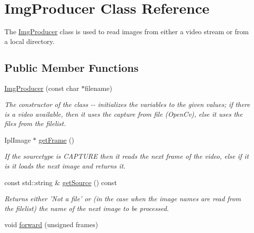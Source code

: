 \hypertarget{classImgProducer}{
\section{ImgProducer Class Reference}
\label{classImgProducer}
}


The {\ttfamily \hyperlink{classImgProducer}{ImgProducer}} class is used to read images from either a video stream or from a local directory.  


\subsection*{Public Member Functions}
\begin{DoxyCompactItemize}
\item 
\hypertarget{classImgProducer_adea70514206a6a2f7c35b9cb48663c5f}{
\hyperlink{classImgProducer_adea70514206a6a2f7c35b9cb48663c5f}{ImgProducer} (const char $\ast$filename)}
\label{classImgProducer_adea70514206a6a2f7c35b9cb48663c5f}

\begin{DoxyCompactList}\small\item\em The constructor of the class -\/-\/ initializes the variables to the given values; if there is a video available, then it uses the capture from file (OpenCv), else it uses the files from the {\ttfamily filelist}. \item\end{DoxyCompactList}\item 
\hypertarget{classImgProducer_a3874d48fa5613c7ed22ab89132b3a5c6}{
IplImage $\ast$ \hyperlink{classImgProducer_a3874d48fa5613c7ed22ab89132b3a5c6}{getFrame} ()}
\label{classImgProducer_a3874d48fa5613c7ed22ab89132b3a5c6}

\begin{DoxyCompactList}\small\item\em If the {\ttfamily sourcetype} is {\ttfamily CAPTURE} then it reads the next frame of the video, else if it is  it loads the next image and returns it. \item\end{DoxyCompactList}\item 
\hypertarget{classImgProducer_a9e0315d8ff2f35e0a752c01ab57166fa}{
const std::string \& \hyperlink{classImgProducer_a9e0315d8ff2f35e0a752c01ab57166fa}{getSource} () const }
\label{classImgProducer_a9e0315d8ff2f35e0a752c01ab57166fa}

\begin{DoxyCompactList}\small\item\em Returns either 'Not a file' or (in the case when the image names are read from the {\ttfamily filelist}) the name of the next image to be processed. \item\end{DoxyCompactList}\item 
\hypertarget{classImgProducer_a14aa046347f577fb0f772b1b79fdcaca}{
void \hyperlink{classImgProducer_a14aa046347f577fb0f772b1b79fdcaca}{forward} (unsigned frames)}
\label{classImgProducer_a14aa046347f577fb0f772b1b79fdcaca}


\end{DoxyCompactItemize}
